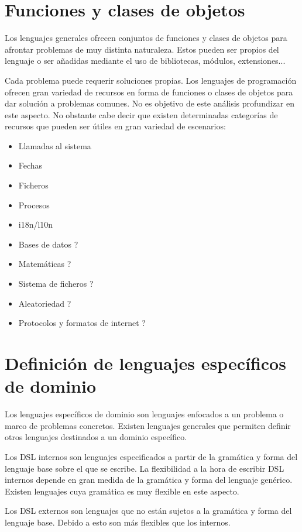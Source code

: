 \section{Funciones y clases de objetos}
Los lenguajes generales ofrecen conjuntos de funciones y clases de objetos para afrontar problemas de muy distinta naturaleza. Estos pueden 
ser propios del lenguaje o ser añadidas mediante el uso de bibliotecas, módulos, extensiones... 

Cada problema puede requerir soluciones propias. Los lenguajes de programación ofrecen gran variedad de recursos en
forma de funciones o clases de objetos para dar solución a problemas comunes. No es objetivo de este análisis profundizar en este aspecto. 
No obstante cabe decir que existen determinadas categorías de recursos que pueden ser útiles en gran variedad de escenarios:

\begin{itemize}
   \item Llamadas al sistema
   \item Fechas
   \item Ficheros
   \item Procesos
   \item i18n/l10n
   \item Bases de datos ?
   \item Matemáticas ?
   \item Sistema de ficheros ?
   \item Aleatoriedad ?
   \item Protocolos y formatos de internet ?
\end{itemize}

\section{Definición de lenguajes específicos de dominio}
Los lenguajes específicos de dominio son lenguajes enfocados a un problema
o marco de problemas concretos. Existen lenguajes generales que permiten definir 
otros lenguajes destinados a un dominio específico. 

Los DSL internos son lenguajes especificados a partir de la gramática y forma del
lenguaje base sobre el que se escribe. La flexibilidad a la hora de escribir DSL internos depende en 
gran medida de la gramática y forma del lenguaje genérico. Existen lenguajes cuya 
gramática es muy flexible en este aspecto.

Los DSL externos son lenguajes que no están sujetos a la gramática y forma del 
lenguaje base. Debido a esto son más flexibles que los internos.

